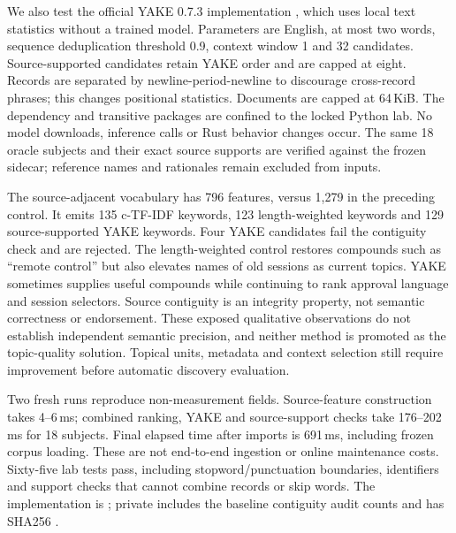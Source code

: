 \documentclass[11pt]{article}
\begin{document}
We also test the official YAKE 0.7.3 implementation \cite{yakeimplementation},
which uses local text statistics without a trained model. Parameters are English,
at most two words, sequence deduplication threshold 0.9, context window 1 and
32 candidates. Source-supported candidates retain YAKE order and are capped at
eight. Records are separated by newline-period-newline to discourage cross-record
phrases; this changes positional statistics. Documents are capped at 64\,KiB.
The dependency and transitive packages are confined to the locked Python lab.
No model downloads, inference calls or Rust behavior changes occur. The same
18 oracle subjects and their exact source supports are verified against the
frozen sidecar; reference names and rationales remain excluded from inputs.

The source-adjacent vocabulary has 796 features, versus 1,279 in the preceding
control. It emits 135 c-TF-IDF keywords, 123 length-weighted keywords and
129 source-supported YAKE keywords. Four YAKE candidates fail the contiguity
check and are rejected. The length-weighted control restores compounds such as
``remote control'' but also elevates names of old sessions as current topics.
YAKE sometimes supplies useful compounds while continuing to rank approval
language and session selectors. Source contiguity is an integrity property, not
semantic correctness or endorsement. These exposed qualitative observations
do not establish independent semantic precision, and neither method is promoted
as the topic-quality solution. Topical units, metadata and context selection
still require improvement before automatic discovery evaluation.

Two fresh runs reproduce non-measurement fields. Source-feature construction
takes 4--6\,ms; combined ranking, YAKE and source-support checks take
176--202\,ms for 18 subjects. Final elapsed time after imports is 691\,ms,
including frozen corpus loading. These are not end-to-end ingestion or online
maintenance costs. Sixty-five lab tests pass, including stopword/punctuation
boundaries, identifiers and support checks that cannot combine records or skip
words. The implementation is ; private
 includes the baseline contiguity audit counts
and has SHA256
.
\end{document}
